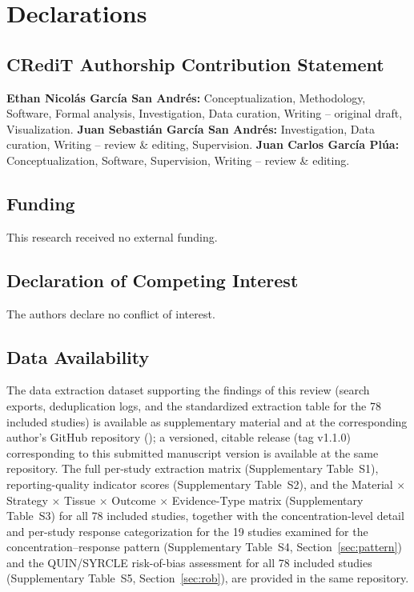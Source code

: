 \documentclass[5p,times,twocolumn]{elsarticle}
\begin{document}
\section*{Declarations}

\subsection*{CRediT Authorship Contribution Statement}

\textbf{Ethan Nicolás García San Andrés:} Conceptualization, Methodology, Software, Formal analysis, Investigation, Data curation, Writing -- original draft, Visualization. \textbf{Juan Sebastián García San Andrés:} Investigation, Data curation, Writing -- review \& editing, Supervision. \textbf{Juan Carlos García Plúa:} Conceptualization, Software, Supervision, Writing -- review \& editing.

\subsection*{Funding}

This research received no external funding.

\subsection*{Declaration of Competing Interest}

The authors declare no conflict of interest.

\subsection*{Data Availability}

The data extraction dataset supporting the findings of this review (search exports, deduplication logs, and the standardized extraction table for the 78 included studies) is available as supplementary material and at the corresponding author's GitHub repository (); a versioned, citable release (tag v1.1.0) corresponding to this submitted manuscript version is available at the same repository. The full per-study extraction matrix (Supplementary Table~S1), reporting-quality indicator scores (Supplementary Table~S2), and the Material $\times$ Strategy $\times$ Tissue $\times$ Outcome $\times$ Evidence-Type matrix (Supplementary Table~S3) for all 78 included studies, together with the concentration-level detail and per-study response categorization for the 19 studies examined for the concentration--response pattern (Supplementary Table~S4, Section~\ref{sec:pattern}) and the QUIN/SYRCLE risk-of-bias assessment for all 78 included studies (Supplementary Table~S5, Section~\ref{sec:rob}), are provided in the same repository.
\end{document}

